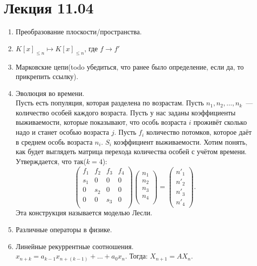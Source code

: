 \section{Лекция 11.04}
\begin{examples}
    \begin{enumerate}
        \item Преобразование плоскости/пространства.
        \item $K[x]_{\le n} \mapsto K[x]_{\le n}$, где  $f\rightarrow f'$
        \item Марковские цепи(todo убедиться, что ранее было определение, если да, то прикрепить ссылку).
        \item Эволюция во времени.\\
            Пусть есть популяция, которая разделена по возрастам. Пусть $n_1, n_2,\dots, n_k$~--- количество особей каждого
            возраста. Пусть у нас заданы коэффициенты выживаемости, которые показывают, что особь возраста $i$ проживёт
            сколько надо и станет особью возраста $j$. Пусть $f_i$ количество потомков, которое даёт в среднем особь возраста $n_i$.
            $S_i$ коэффициент выживаемости. 
            Хотим понять, как будет выглядеть матрица перехода количества особей с учётом времени. Утверждается, что так($k = 4$):
            \[
            \begin{pmatrix}
                f_1&f_2&f_3&f_4\\
                s_1&0&0&0\\
                0&s_2&0&0\\
                0&0&s_3&0\\
            \end{pmatrix}
            \begin{pmatrix}
                n_1\\
                n_2\\
                n_3\\
                n_4\\
            \end{pmatrix}
             =
             \begin{pmatrix}
                 n'_1\\
                 n'_2\\
                 n'_3\\
                 n'_4
             \end{pmatrix}
            .\] 
            Эта конструкция называется моделью Лесли.
        \item
            Различные операторы в физике.
        \item
            Линейные рекуррентные соотношения.\\
            $x_{n + k} = a_{k-1}x_{n + (k - 1)} + \dots + a_0x_n$.
            Тогда:
            $X_{n + 1} = AX_n$.
    \end{enumerate}
\end{examples}
